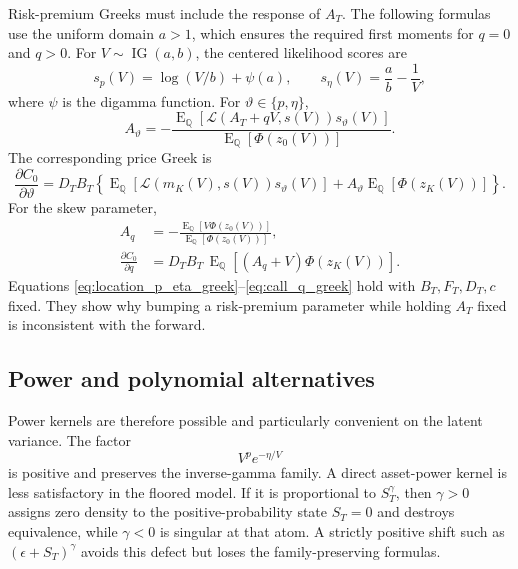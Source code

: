 \documentclass[11pt,a4paper]{article}
\DeclareMathOperator{\IG}{IG}
\DeclareMathOperator{\E}{E}
\begin{document}
Risk-premium Greeks must include the response of $A_T$.  The following
formulas use the uniform domain $a>1$, which ensures the required first
moments for $q=0$ and $q>0$.  For
$V\sim\IG(a,b)$, the centered likelihood scores are
\begin{equation}
  s_p(V)=\log(V/b)+\psi(a),\qquad
  s_\eta(V)=\frac{a}{b}-\frac{1}{V},
  \label{eq:ig_risk_premium_scores}
\end{equation}
where $\psi$ is the digamma function.  For
$\vartheta\in\{p,\eta\}$,
\begin{equation}
  A_\vartheta
  =
  -\frac{
    \E_{\mathbb Q}[
      \mathcal L(A_T+qV,s(V))s_\vartheta(V)
    ]}
    {\E_{\mathbb Q}[\Phi(z_0(V))]}.
  \label{eq:location_p_eta_greek}
\end{equation}
The corresponding price Greek is
\begin{equation}
  \frac{\partial C_0}{\partial\vartheta}
  =
  D_TB_T\left\{
    \E_{\mathbb Q}[
      \mathcal L(m_K(V),s(V))s_\vartheta(V)
    ]
    +A_\vartheta\E_{\mathbb Q}[\Phi(z_K(V))]
  \right\}.
  \label{eq:call_p_eta_greek}
\end{equation}
For the skew parameter,
\begin{align}
  A_q
  &=
  -\frac{\E_{\mathbb Q}[V\Phi(z_0(V))]}
         {\E_{\mathbb Q}[\Phi(z_0(V))]},
  \label{eq:location_q_greek}
  \\
  \frac{\partial C_0}{\partial q}
  &=
  D_TB_T\,\E_{\mathbb Q}[
    (A_q+V)\Phi(z_K(V))
  ].
  \label{eq:call_q_greek}
\end{align}
Equations \eqref{eq:location_p_eta_greek}--\eqref{eq:call_q_greek} hold with
$B_T,F_T,D_T,c$ fixed.  They show why bumping a risk-premium parameter while
holding $A_T$ fixed is inconsistent with the forward.

\subsection{Power and polynomial alternatives}

Power kernels are therefore possible and particularly convenient on the
latent variance.  The factor
\[
  V^p e^{-\eta/V}
\]
is positive and preserves the inverse-gamma family.  A direct asset-power
kernel is less satisfactory in
the floored model.  If it is proportional to $S_T^\gamma$, then
$\gamma>0$ assigns zero density to the positive-probability state $S_T=0$
and destroys equivalence, while $\gamma<0$ is singular at that atom.  A
strictly positive shift such as $(\epsilon+S_T)^\gamma$ avoids this defect
but loses the family-preserving formulas.
\end{document}
